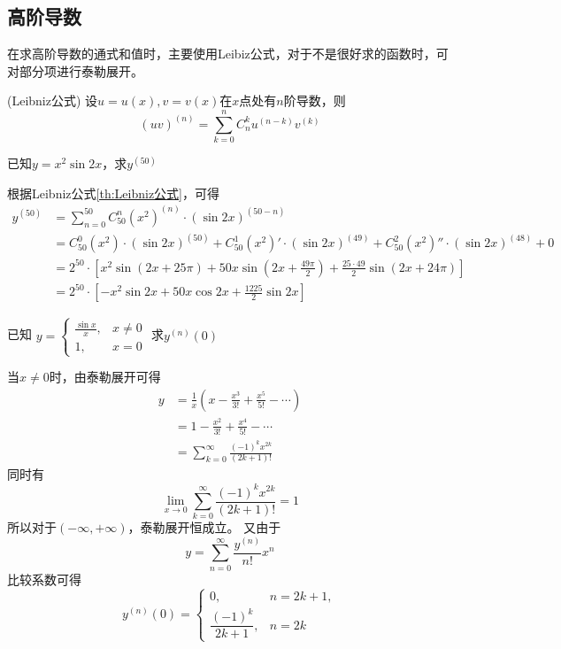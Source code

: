 \subsection{高阶导数}
在求高阶导数的通式和值时，主要使用Leibiz公式，对于不是很好求的函数时，可对部分项进行泰勒展开。
\begin{theorem}
    (Leibniz公式)
    \label{th:Leibniz公式}
    设$u=u(x),v=v(x)$在$x$点处有$n$阶导数，则
    \[ (uv)^{(n)} = \sum^n_{k=0}C^k_n u^{(n-k)}v^{(k)} \]
\end{theorem}

\begin{example}
    已知$y=x^2\sin 2x$，求$y^{(50)}$
\end{example}
\begin{solution}
    根据Leibniz公式\ref{th:Leibniz公式}，可得
    \begin{align}
        y^{(50)} & = \sum_{n=0}^{50} C_{50}^n (x^2)^{(n)}\cdot(\sin 2x)^{(50-n)}                                                       \\
                 & = C_{50}^0(x^2)\cdot(\sin 2x)^{(50)} + C_{50}^1(x^2)'\cdot(\sin 2x)^{(49)} + C_{50}^2(x^2)''\cdot(\sin 2x)^{(48)}+0 \\
                 & = 2^{50}\cdot \left[ x^2 \sin(2x+25\pi) + 50x\sin(2x+\frac{49\pi}{2})+\frac{25 \cdot 49}{2}\sin(2x+24\pi) \right]   \\
                 & = 2^{50}\cdot\left[ -x^2\sin 2x + 50x\cos 2x + \frac{1225}{2}\sin 2x \right]
    \end{align}
\end{solution}

\begin{example}
    已知
    \begin{math}
        y =
        \begin{cases}
            \frac{\sin x}{x}, & x \neq 0 \\
            1,                & x = 0
        \end{cases}
    \end{math}
    求$y^{(n)}(0)$
\end{example}
\begin{solution}
    当$x\neq 0$时，由泰勒展开可得
    \begin{align}
        y & = \frac{1}{x}(x - \frac{x^3}{3!} + \frac{x^5}{5!} - \cdots) \\
          & = 1-\frac{x^2}{3!}+\frac{x^4}{5!}-\cdots                    \\
          & =\sum_{k=0}^\infty \frac{(-1)^{k}x^{2k}}{(2k+1)!}
    \end{align}
    同时有
    \[ \lim_{x \to 0} \sum_{k=0}^\infty \frac{(-1)^{k}x^{2k}}{(2k+1)!} = 1 \]
    所以对于$(-\infty,+\infty)$，泰勒展开恒成立。
    又由于
    \[ y = \sum_{n=0}^{\infty}\frac{y^{(n)}}{n!}x^{n} \]
    比较系数可得
    \[
        y^{(n)}(0) =
        \begin{cases}
            0,                      & n = 2k+1, \\
            \dfrac{(-1)^{k}}{2k+1}, & n=2k
        \end{cases}
    \]
\end{solution}

